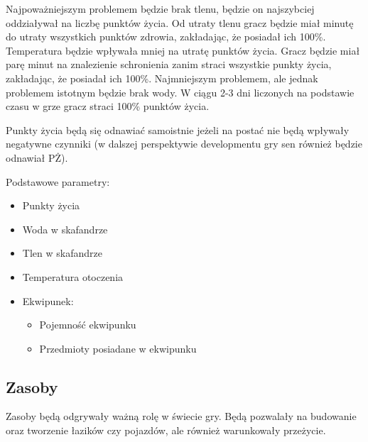\documentclass[a4paper,12pt]{article}
\begin{document}
Najpoważniejszym problemem będzie brak tlenu, będzie on najszybciej oddziaływał na liczbę punktów życia. Od utraty tlenu gracz będzie miał minutę do utraty wszystkich punktów zdrowia, zakładając, że posiadał ich 100\%.
Temperatura będzie wpływała mniej na utratę punktów życia. Gracz będzie miał parę minut na znalezienie schronienia zanim straci wszystkie punkty życia, zakładając, że posiadał ich 100\%.
Najmniejszym problemem, ale jednak problemem istotnym będzie brak wody. W ciągu 2-3 dni liczonych na podstawie czasu w grze gracz straci 100\% punktów życia.

Punkty życia będą się odnawiać samoistnie jeżeli na postać nie będą wpływały negatywne czynniki (w dalszej perspektywie developmentu gry sen również będzie odnawiał PŻ).

Podstawowe parametry:
\begin{itemize}
	\item Punkty życia
	\item Woda w skafandrze
	\item Tlen w skafandrze
	\item Temperatura otoczenia
	\item Ekwipunek:
	\begin{itemize}
		\item Pojemność ekwipunku
		\item Przedmioty posiadane w ekwipunku
	\end{itemize}
\end{itemize}

\subsection{Zasoby}
Zasoby będą odgrywały ważną rolę w świecie gry. Będą pozwalały na budowanie oraz tworzenie łazików czy pojazdów, ale również warunkowały przeżycie.
\end{document}
